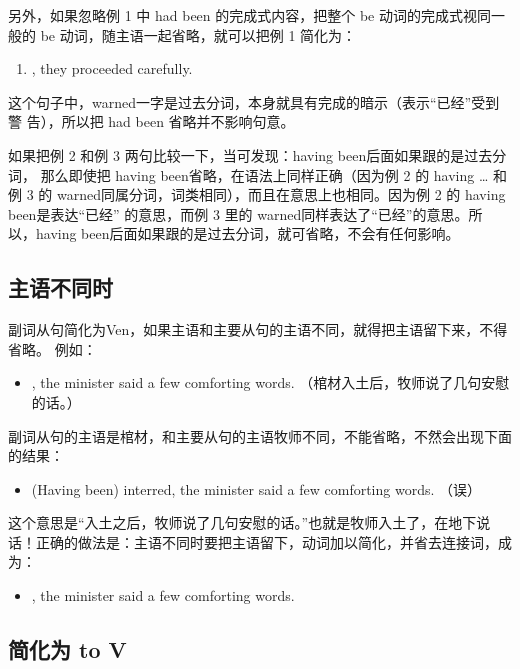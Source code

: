 另外，如果忽略例 1 中 had been 的完成式内容，把整个 be
动词的完成式视同一般的 be 动词，随主语一起省略，就可以把例 1 简化为：
\begin{enumerate}[resume]
\item {}, they proceeded carefully.
\end{enumerate}
这个句子中，warned一字是过去分词，本身就具有完成的暗示（表示“已经”受到警
告），所以把 had been 省略并不影响句意。

如果把例 2 和例 3 两句比较一下，当可发现：having been后面如果跟的是过去分词，
那么即使把 having been省略，在语法上同样正确（因为例 2 的 having \ldots{} 和
例 3 的 warned同属分词，词类相同），而且在意思上也相同。因为例 2 的 having
been是表达“已经” 的意思，而例 3 里的 warned同样表达了“已经”的意思。所
以，having been后面如果跟的是过去分词，就可省略，不会有任何影响。

\subsection{主语不同时}

副词从句简化为Ven，如果主语和主要从句的主语不同，就得把主语留下来，不得省略。
例如：

\begin{itemize}
\item {}, the minister said a few comforting
  words. （棺材入土后，牧师说了几句安慰的话。）
\end{itemize}
副词从句的主语是棺材，和主要从句的主语牧师不同，不能省略，不然会出现下面的结果：
\begin{itemize}
\item (Having been) interred, the minister said a few comforting words. （误）
\end{itemize}
这个意思是“入土之后，牧师说了几句安慰的话。”也就是牧师入土了，在地下说话！正确的做法是：主语不同时要把主语留下，动词加以简化，并省去连接词，成为：
\begin{itemize}
\item {}, the minister said a few comforting
  words.
\end{itemize}

\subsection{简化为 to V}


